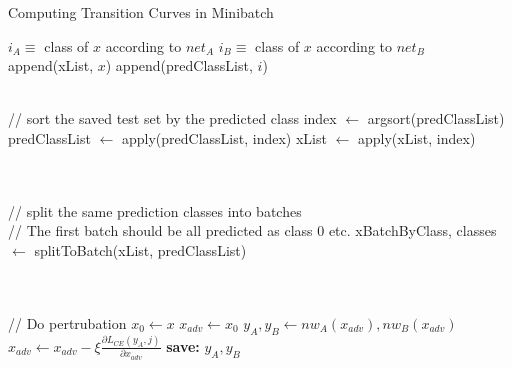 \documentclass{article}
\begin{document}
\begin{algorithm}[H]
    \centering
    \caption{Computing Transition Curves in Minibatch}\label{algorithm2}
    \begin{algorithmic}[1]
        \State {}
        \State {}
        
        \State {}
            \State $i_A\equiv$ class of $x$ according to $net_A$
            \State $i_B\equiv$ class of $x$ according to $net_B$
                \State append(xList, $x$)
                \State append(predClassList, $i$)
            \EndIf
        \EndFor
        
        \\
        // sort the saved test set by the predicted class
        \State index $\gets$ argsort(predClassList)
        \State predClassList $\gets$ apply(predClassList, index)
        \State xList $\gets$ apply(xList, index)
        
        \\
        \\
        // split the same prediction classes into batches  \\
        // The first batch should be all predicted as class 0 etc.
        \State xBatchByClass, classes $\gets$ splitToBatch(xList, predClassList)

        \\ \\
        // Do pertrubation
            \State $x_0 \gets x$
                \State $x_{adv} \gets x_0$
                    \State$y_A, y_B\gets nw_A(x_{adv}),nw_B(x_{adv})$
                    \State $x_{adv} \gets x_{adv}- \xi\frac{\partial L_{CE}(y_A,j)}{\partial x_{adv}}$
                    \State \textbf{save:} $y_A,y_B$
                \EndFor
            \EndFor
        \EndFor
        
    \end{algorithmic}
\end{algorithm}
\end{document}

